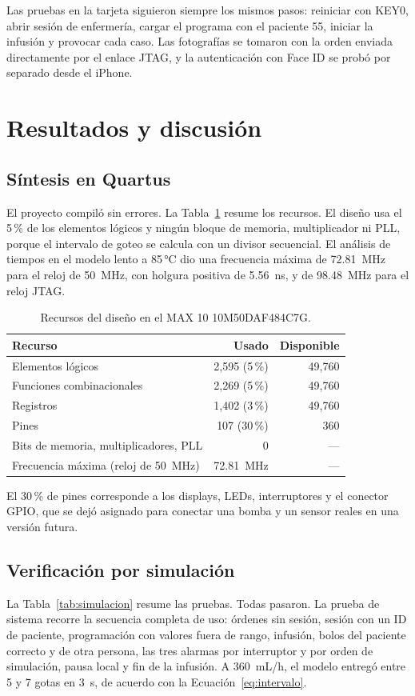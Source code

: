 \documentclass[11pt,letterpaper]{article}
\begin{document}
Las pruebas en la tarjeta siguieron siempre los mismos pasos: reiniciar con KEY0, abrir sesión de enfermería, cargar el programa con el paciente 55, iniciar la infusión y provocar cada caso. Las fotografías se tomaron con la orden enviada directamente por el enlace JTAG, y la autenticación con Face ID se probó por separado desde el iPhone.

\section{Resultados y discusión}\label{sec:resultados}

\subsection{Síntesis en Quartus}
El proyecto compiló sin errores. La Tabla~\ref{tab:recursos} resume los recursos. El diseño usa el 5\,\% de los elementos lógicos y ningún bloque de memoria, multiplicador ni PLL, porque el intervalo de goteo se calcula con un divisor secuencial. El análisis de tiempos en el modelo lento a 85\,°C dio una frecuencia máxima de 72.81~MHz para el reloj de 50~MHz, con holgura positiva de 5.56~ns, y de 98.48~MHz para el reloj JTAG.

\begin{table}[H]
\centering
\caption{Recursos del diseño en el MAX 10 10M50DAF484C7G.}
\label{tab:recursos}
\begin{tabular}{lrr}
\toprule
\textbf{Recurso} & \textbf{Usado} & \textbf{Disponible} \\
\midrule
Elementos lógicos & 2,595 (5\,\%) & 49,760 \\
Funciones combinacionales & 2,269 (5\,\%) & 49,760 \\
Registros & 1,402 (3\,\%) & 49,760 \\
Pines & 107 (30\,\%) & 360 \\
Bits de memoria, multiplicadores, PLL & 0 & --- \\
Frecuencia máxima (reloj de 50~MHz) & 72.81~MHz & --- \\
\bottomrule
\end{tabular}
\end{table}

El 30\,\% de pines corresponde a los displays, LEDs, interruptores y el conector GPIO, que se dejó asignado para conectar una bomba y un sensor reales en una versión futura.

\subsection{Verificación por simulación}
La Tabla~\ref{tab:simulacion} resume las pruebas. Todas pasaron. La prueba de sistema recorre la secuencia completa de uso: órdenes sin sesión, sesión con un ID de paciente, programación con valores fuera de rango, infusión, bolos del paciente correcto y de otra persona, las tres alarmas por interruptor y por orden de simulación, pausa local y fin de la infusión. A 360~mL/h, el modelo entregó entre 5 y 7 gotas en 3~s, de acuerdo con la Ecuación~\eqref{eq:intervalo}.
\end{document}
